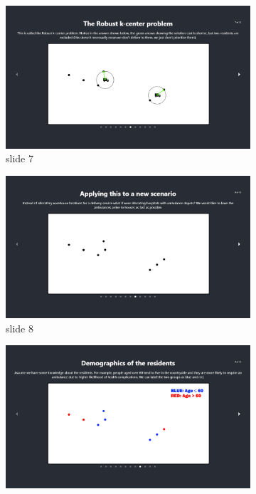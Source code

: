 \begin{figure}[H]\ContinuedFloat
    \begin{subfigure}{0.5\textwidth}
        \centering
        \includegraphics[width=\textwidth]{images/learn_06-base.png}
        \caption{slide 7}
    \end{subfigure}
    \vspace{0.75cm}
    \begin{subfigure}{0.5\textwidth}
        \centering
        \includegraphics[width=\textwidth]{images/learn_07-base.png}
        \caption{slide 8}
    \end{subfigure}
    \vspace{0.75cm}
    \begin{subfigure}{0.5\textwidth}
        \centering
        \includegraphics[width=\textwidth]{images/learn_08-base.png}

\end{subfigure}
\end{figure}
